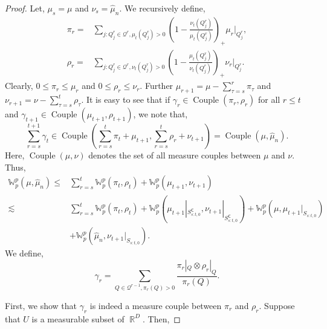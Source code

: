 \documentclass[12pts]{article}
\def\Real{\mathop{\mathbb{R}}\nolimits}
\newcommand{\sQ}{ \mathscr{Q}}
\newcommand{\hmu}{\hat{\mu}}
\newcommand{\fW}{\mathbb{W}}
\begin{document}
\begin{proof}
 Let,  $\mu_s = \mu$ and $\nu_s = \hmu_n$. We recursively define, 
 \begin{align*}
     \pi_r = & \sum_{j: Q^r_j \in  \sQ^r, \mu_t(Q^r_j) > 0} \left(1 - \frac{\nu_t(Q^r_j)}{\mu_t(Q^r_j)}\right)_+ \mu_r|_{Q^r_j}, \\
      \rho_r = & \sum_{j: Q^r_j \in  \sQ^r, \nu_t(Q^r_j) > 0} \left(1 - \frac{\mu_t(Q^r_j)}{\nu_t(Q^r_j)}\right)_+ \nu_r|_{Q^r_j}. 
 \end{align*}
 Clearly, $0 \le \pi_r \le \mu_r$ and $0 \le \rho_r \le \nu_r$. Further $\mu_{r+1} = \mu - \sum_{\tau = s}^r \pi_\tau$ and $\nu_{r+1} = \nu - \sum_{\tau = s}^t \rho_\tau$. It is easy to see that if $\gamma_r \in \operatorname{Couple}(\pi_r, \rho_r)$ for all $r \le t$ and  $\gamma_{t+1} \in \operatorname{Couple}(\mu_{t+1}, \rho_{t + 1})$, we note that,
 \[\sum_{r=s}^{t + 1} \gamma_t \in \operatorname{Couple}\left(\sum_{r=s}^{t} \pi_t + \mu_{t + 1}, \sum_{r=s}^{t} \rho_r + \nu_{t + 1}\right) = \operatorname{Couple}(\mu, \hmu_n).\]
Here, $\operatorname{Couple}(\mu, \nu)$ denotes the set of all measure couples between $\mu$ and $\nu$. Thus, 
 \begin{align}
    \fW_p^p(\mu, \hmu_n) 
    \le & \sum_{r=s}^{t} \fW_p^p (\pi_t, \rho_t) + \fW_p^p(\mu_{t+1}, \nu_{t + 1})\nonumber\\
     \lesssim & \sum_{r=s}^{t} \fW_p^p (\pi_t, \rho_t) + \fW_p^p(\mu_{t+1}|_{S_{s:t,0}^\mathsf{C}}, \nu_{t + 1}|_{S_{s:t,0}^\mathsf{C}})   + \fW_p^p(\mu, \mu_{t+1}|_{S_{s:t,0}}) \nonumber\\
     &+ \fW_p^p(\hmu_n, \nu_{t+1}|_{S_{s:t,0}}). \label{e13}
 \end{align}
 We define, \[\gamma_r = \sum_{ Q \in  \sQ^{r-1}, \pi_r(Q) > 0} \frac{\pi_r|_{Q} \otimes \rho_r|_{Q}}{\pi_r(Q)}.\] 
 
 First, we show that $\gamma_r$ is indeed a measure couple between $\pi_r$ and $\rho_r$. Suppose that $U$ is a measurable subset of $\Real^D$. Then,


\end{proof}
\end{document}

